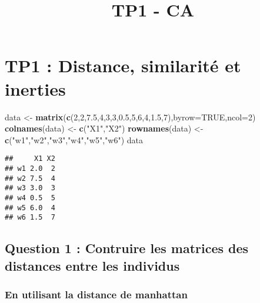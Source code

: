 \documentclass[]{article}
\title{TP1 - CA}
\author{}
\date{}
\newenvironment{Shaded}{\begin{snugshade}}{\end{snugshade}}
\newcommand{\DataTypeTok}[1]{\textcolor[rgb]{0.13,0.29,0.53}{#1}}
\newcommand{\DecValTok}[1]{\textcolor[rgb]{0.00,0.00,0.81}{#1}}
\newcommand{\FloatTok}[1]{\textcolor[rgb]{0.00,0.00,0.81}{#1}}
\newcommand{\KeywordTok}[1]{\textcolor[rgb]{0.13,0.29,0.53}{\textbf{#1}}}
\newcommand{\NormalTok}[1]{#1}
\newcommand{\OtherTok}[1]{\textcolor[rgb]{0.56,0.35,0.01}{#1}}
\newcommand{\StringTok}[1]{\textcolor[rgb]{0.31,0.60,0.02}{#1}}
\begin{document}
\maketitle

\hypertarget{tp1-distance-similarituxe9-et-inerties}{%
\section{TP1 : Distance, similarité et
inerties}\label{tp1-distance-similarituxe9-et-inerties}}

\begin{Shaded}
\begin{Highlighting}[]
\NormalTok{data <-}\StringTok{ }\KeywordTok{matrix}\NormalTok{(}\KeywordTok{c}\NormalTok{(}\DecValTok{2}\NormalTok{,}\DecValTok{2}\NormalTok{,}\FloatTok{7.5}\NormalTok{,}\DecValTok{4}\NormalTok{,}\DecValTok{3}\NormalTok{,}\DecValTok{3}\NormalTok{,}\FloatTok{0.5}\NormalTok{,}\DecValTok{5}\NormalTok{,}\DecValTok{6}\NormalTok{,}\DecValTok{4}\NormalTok{,}\FloatTok{1.5}\NormalTok{,}\DecValTok{7}\NormalTok{),}\DataTypeTok{byrow=}\OtherTok{TRUE}\NormalTok{,}\DataTypeTok{ncol=}\DecValTok{2}\NormalTok{)}
\KeywordTok{colnames}\NormalTok{(data) <-}\StringTok{ }\KeywordTok{c}\NormalTok{(}\StringTok{"X1"}\NormalTok{,}\StringTok{"X2"}\NormalTok{)}
\KeywordTok{rownames}\NormalTok{(data) <-}\StringTok{ }\KeywordTok{c}\NormalTok{(}\StringTok{"w1"}\NormalTok{,}\StringTok{"w2"}\NormalTok{,}\StringTok{"w3"}\NormalTok{,}\StringTok{"w4"}\NormalTok{,}\StringTok{"w5"}\NormalTok{,}\StringTok{"w6"}\NormalTok{)}
\NormalTok{data}
\end{Highlighting}
\end{Shaded}

\begin{verbatim}
##     X1 X2
## w1 2.0  2
## w2 7.5  4
## w3 3.0  3
## w4 0.5  5
## w5 6.0  4
## w6 1.5  7
\end{verbatim}

\hypertarget{question-1-contruire-les-matrices-des-distances-entre-les-individus}{%
\subsection{Question 1 : Contruire les matrices des distances entre les
individus}\label{question-1-contruire-les-matrices-des-distances-entre-les-individus}}

\hypertarget{en-utilisant-la-distance-de-manhattan}{%
\subsubsection{En utilisant la distance de
manhattan}\label{en-utilisant-la-distance-de-manhattan}}
\end{document}
